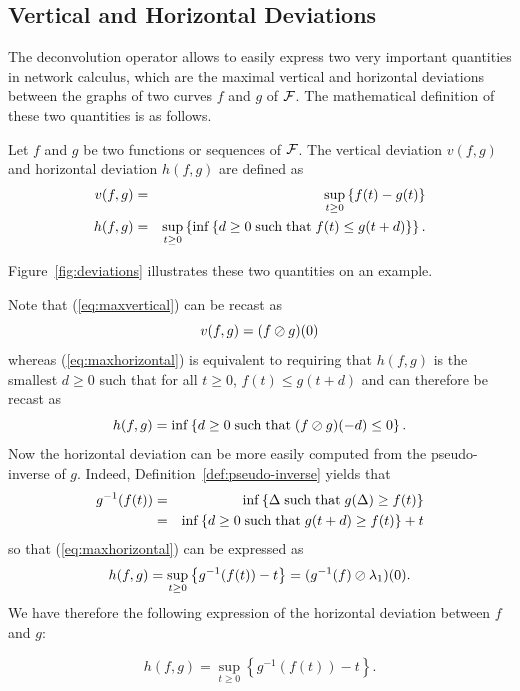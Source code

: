 \subsection{Vertical and Horizontal Deviations}
The deconvolution operator allows to easily express two very important quantities in
 network calculus, which are the maximal vertical and horizontal deviations between
the graphs of two curves $f$ and $g$ of $\mathcal F$. The mathematical definition of
these two quantities is as follows.
\begin{definition}
Let $f$ and $g$ be two functions or sequences of $\mathcal F$. The vertical deviation $v(f,g)$
and horizontal deviation $h(f,g)$ are defined as
\begin{eqnarray}
\mylabel{eq:maxvertical}
v (f,g) & = & \sup_{t \geq 0} \left\{ f(t) - g(t) \right\} \\
\mylabel{eq:maxhorizontal}
h (f,g) & = & \sup_{t \geq 0} \left\{ \inf \left\{ d \geq 0 \mst f(t) \leq g(t+d) \right\} \right\}.
\end{eqnarray}
\end{definition}
Figure~\ref{fig:deviations} illustrates these two quantities on an example.
\begin{figure}[!htbp]
\end{figure}

Note that (\ref{eq:maxvertical}) can be recast as
\begin{equation}
\mylabel{eq:maxverticaloslash}
v (f,g) = (f \oslash g) (0)
\end{equation}
whereas (\ref{eq:maxhorizontal}) is equivalent to requiring that $h (f,g)$ is the smallest $d \geq 0$
such that for all $t \geq 0$, $f(t) \leq g(t+d)$ and can therefore be recast as
$$h(f,g) =  \inf \left\{ d \geq 0 \mathrm{\; such \; that \; } (f \oslash g) (-d) \leq 0 \right\}.$$
Now the horizontal deviation can be more easily computed from the pseudo-inverse of $g$.
Indeed, Definition~\ref{def:pseudo-inverse} yields that
\begin{eqnarray*}
g^{-1}(f(t)) & = & \inf \left\{ \Delta \mathrm{\; such \; that \; } g(\Delta ) \geq f(t) \right\} \\
         & = &  \inf \left\{ d \geq 0 \mathrm{\; such \; that \; } g(t+d) \geq f(t) \right\} + t
\end{eqnarray*}
so that (\ref{eq:maxhorizontal}) can be expressed as
\begin{equation}
\mylabel{eq:maxhorizontaloslash}
h (f,g) = \sup_{t \geq 0} \left\{ g^{-1}(f(t)) - t \right\} = (g^{-1}(f) \oslash \lambda_1)(0).
\end{equation}
We have therefore the following expression of the horizontal deviation between $f$ and $g$:
\begin{proposition}
$$ h (f,g) = \sup_{t \geq 0} \left\{ g^{-1}(f(t)) - t \right\}. $$
\end{proposition}

